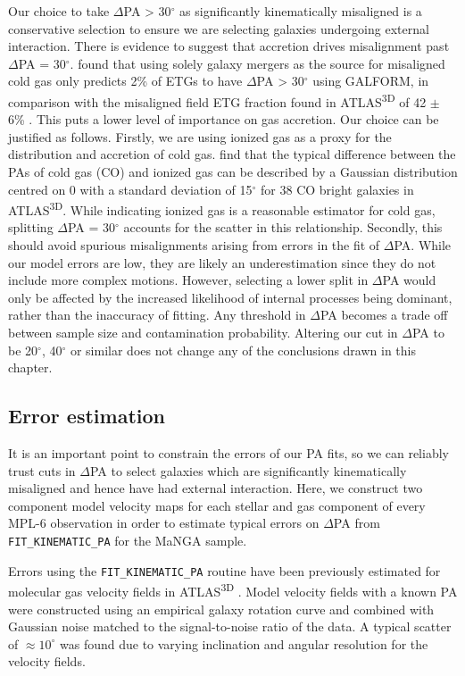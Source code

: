Our choice to take $\Delta$PA > 30$^{\circ}$ as significantly kinematically misaligned is a conservative selection to ensure we are selecting galaxies undergoing external interaction. There is evidence to suggest that accretion drives misalignment past $\Delta$PA = 30$^{\circ}$. \citet{lagos2015} found that using solely galaxy mergers as the source for misaligned cold gas only predicts 2\% of ETGs to have $\Delta$PA > 30$^{\circ}$ using GALFORM, in comparison with the misaligned field ETG fraction found in ATLAS\textsuperscript{3D} of 42 $\pm$ 6\%  \citep{davis2011a}. This puts a lower level of importance on gas accretion. Our choice can be justified as follows. Firstly, we are using ionized gas as a proxy for the distribution and accretion of cold gas. \citet{davis2011a} find that the typical difference between the PAs of cold gas (CO) and ionized gas can be described by a Gaussian distribution centred on 0 with a standard deviation of 15$^{\circ}$ for 38 CO bright galaxies in ATLAS\textsuperscript{3D}. While indicating ionized gas is a reasonable estimator for cold gas, splitting $\Delta$PA = 30$^{\circ}$ accounts for the scatter in this relationship. Secondly, this should avoid spurious misalignments arising from errors in the fit of $\Delta$PA. While our model errors are low, they are likely an underestimation since they do not include more complex motions. However, selecting a lower split in $\Delta$PA would only be affected by the increased likelihood of internal processes being dominant, rather than the inaccuracy of fitting. Any threshold in $\Delta$PA becomes a trade off between sample size and contamination probability. Altering our cut in $\Delta$PA to be 20$^{\circ}$, 40$^{\circ}$ or similar does not change any of the conclusions drawn in this chapter.

\subsection{Error estimation}
It is an important point to constrain the errors of our PA fits, so we can reliably trust cuts in $\Delta$PA to select galaxies which are significantly kinematically misaligned and hence have had external interaction. Here, we construct two component model velocity maps for each stellar and gas component of every MPL-6 observation in order to estimate typical errors on $\Delta$PA from \texttt{FIT\_KINEMATIC\_PA} for the MaNGA sample. 

Errors using the \texttt{FIT\_KINEMATIC\_PA} routine have been previously estimated for molecular gas velocity fields in ATLAS\textsuperscript{3D} \citep{davis2011a}. Model velocity fields with a known PA were constructed using an empirical galaxy rotation curve and combined with Gaussian noise matched to the signal-to-noise ratio of the data. A typical scatter of $\approx10^{\circ}$ was found due to varying inclination and angular resolution for the velocity fields.

